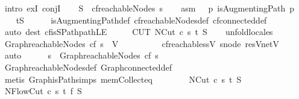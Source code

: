\begin{isabellebody}
%
\isadelimproof
%
\endisadelimproof
%
\isatagproof
{}\isamarkupfalse%
\ {\isacharparenleft}intro\ exI\ conjI{\isacharparenright}\isanewline
\ \ \isamarkupfalse%
\ {\isacharquery}S\ {\isacharequal}\ {\isachardoublequoteopen}cf{\isachardot}reachableNodes\ s{\isachardoublequoteclose}\isanewline
\ \ \isamarkupfalse%
\ asm{\isacharcolon}\ {\isachardoublequoteopen}{\isasymnot}\ {\isacharparenleft}{\isasymexists}\ p{\isachardot}\ isAugmentingPath\ p{\isacharparenright}{\isachardoublequoteclose}\isanewline
\ \ \isamarkupfalse%
\ {\isachardoublequoteopen}t{\isasymnotin}{\isacharquery}S{\isachardoublequoteclose}\isanewline
\ \ \ \ \isamarkupfalse%
\ isAugmentingPath{\isacharunderscore}def\ cf{\isachardot}reachableNodes{\isacharunderscore}def\ cf{\isachardot}connected{\isacharunderscore}def\isanewline
\ \ \ \ \isamarkupfalse%
\ {\isacharparenleft}auto\ dest{\isacharcolon}\ cf{\isachardot}isSPath{\isacharunderscore}pathLE{\isacharparenright}\isanewline
\ \ \isamarkupfalse%
\ \isamarkupfalse%
\ CUT{\isacharcolon}\ {\isachardoublequoteopen}NCut\ c\ s\ t\ {\isacharquery}S{\isachardoublequoteclose}\isanewline
\ \ \isamarkupfalse%
\ unfold{\isacharunderscore}locales\isanewline
\ \ \ \ \isamarkupfalse%
\ {\isachardoublequoteopen}Graph{\isachardot}reachableNodes\ cf\ s\ {\isasymsubseteq}\ V{\isachardoublequoteclose}\ \ \isanewline
\ \ \ \ \ \ \isamarkupfalse%
\ cf{\isachardot}reachable{\isacharunderscore}ss{\isacharunderscore}V\ s{\isacharunderscore}node\ resV{\isacharunderscore}netV\ \isamarkupfalse%
\ auto\isanewline
\ \ \ \ \isamarkupfalse%
\ {\isachardoublequoteopen}s\ {\isasymin}\ Graph{\isachardot}reachableNodes\ cf\ s{\isachardoublequoteclose}\ \isanewline
\ \ \ \ \ \ \isamarkupfalse%
\ Graph{\isachardot}reachableNodes{\isacharunderscore}def\ Graph{\isachardot}connected{\isacharunderscore}def\ \isanewline
\ \ \ \ \ \ \isamarkupfalse%
\ {\isacharparenleft}metis\ Graph{\isachardot}isPath{\isachardot}simps{\isacharparenleft}{}{\isacharparenright}\ mem{\isacharunderscore}Collect{\isacharunderscore}eq{\isacharparenright}\isanewline
\ \ \isamarkupfalse%
\isanewline
\ \ \isamarkupfalse%
\ \isamarkupfalse%
\ NCut\ c\ s\ t\ {\isacharquery}S\ \isacommand{{\isachardot}}\isamarkupfalse%
\isanewline
\ \ \isamarkupfalse%
\ NFlowCut\ c\ s\ t\ f\ {\isacharquery}S\ \isamarkupfalse%

\end{isabellebody}
